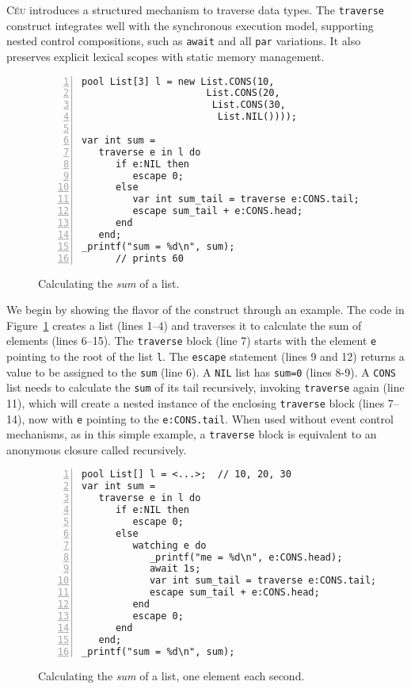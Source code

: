 \documentclass{acm_proc_article-sp}
\newcommand{\CEU}{\textsc{C\'{e}u}\xspace}
\newcommand{\code}[1] {{\small{\texttt{#1}}}}
\begin{document}
\CEU introduces a structured mechanism to traverse data types.
The \code{traverse} construct integrates well with the synchronous execution 
model, supporting nested control compositions, such as \code{await} and all 
\code{par} variations.
It also preserves explicit lexical scopes with static memory management.

\begin{figure}%
\begin{lstlisting}[numbers=left,xleftmargin=3em]
pool List[3] l = new List.CONS(10,
                      List.CONS(20,
                       List.CONS(30,
                        List.NIL())));

var int sum =
   traverse e in l do
      if e:NIL then
         escape 0;
      else
         var int sum_tail = traverse e:CONS.tail;
         escape sum_tail + e:CONS.head;
      end
   end;
_printf("sum = %d\n", sum);
      // prints 60
\end{lstlisting}
\caption{
Calculating the \emph{sum} of a list.
\label{lst.list.sum}
}
\end{figure}

We begin by showing the flavor of the construct through an example.
The code in Figure~\ref{lst.list.sum} creates a list (lines 1--4) and traverses 
it to calculate the sum of elements (lines 6--15).
The \code{traverse} block (line 7) starts with the element \code{e} pointing to 
the root of the list \code{l}.
The \code{escape} statement (lines 9 and 12) returns a value to be assigned to 
the \code{sum} (line 6).
A \code{NIL} list has \code{sum=0} (lines 8-9).
A \code{CONS} list needs to calculate the \code{sum} of its tail recursively, 
invoking \code{traverse} again (line 11), which will create a nested instance 
of the enclosing \code{traverse} block (lines 7--14), now with \code{e} 
pointing to the \code{e:CONS.tail}.
When used without event control mechanisms, as in this simple example,
a \code{traverse} block is equivalent to an anonymous closure called recursively.

\begin{figure}%
\begin{lstlisting}[numbers=left,xleftmargin=3em]
pool List[] l = <...>;  // 10, 20, 30
var int sum =
   traverse e in l do
      if e:NIL then
         escape 0;
      else
         watching e do
            _printf("me = %d\n", e:CONS.head);
            await 1s;
            var int sum_tail = traverse e:CONS.tail;
            escape sum_tail + e:CONS.head;
         end
         escape 0;
      end
   end;
_printf("sum = %d\n", sum);
\end{lstlisting}
\caption{
Calculating the \emph{sum} of a list, one element each second.
\label{lst.list.sum.react}
}
\end{figure}
\end{document}
